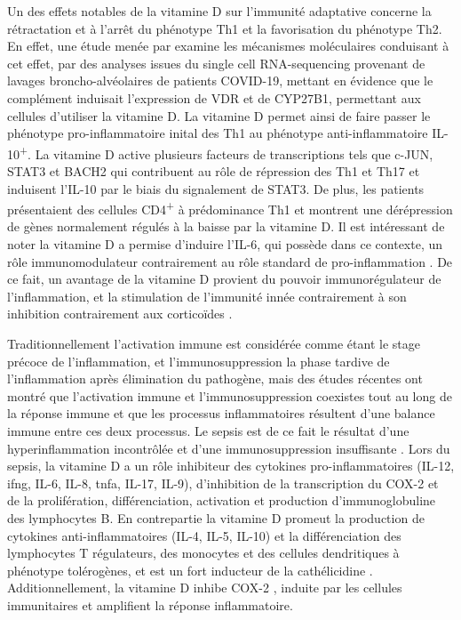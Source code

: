 \documentclass[
  a4paper,
  DIV=11,
  numbers=noendperiod,
  listof=totoc]{scrreprt}
\begin{document}
Un des effets notables de la vitamine D sur l'immunité adaptative
concerne la rétractation et à l'arrêt du phénotype \ac{Th1} et la
favorisation du phénotype Th2. En effet, une étude menée par
\textcite{Chauss.2022} examine les mécanismes moléculaires conduisant à
cet effet, par des analyses issues du single cell RNA-sequencing
provenant de lavages broncho-alvéolaires de patients COVID-19, mettant
en évidence que le complément induisait l'expression de \ac{VDR} et de
\ac{CYP27B1}, permettant aux cellules d'utiliser la vitamine D. La
vitamine D permet ainsi de faire passer le phénotype pro-inflammatoire
inital des \ac{Th1} au phénotype anti-inflammatoire
IL-10\textsuperscript{+}. La vitamine D active plusieurs facteurs de
transcriptions tels que c-JUN, STAT3 et BACH2 qui contribuent au rôle de
répression des \ac{Th1} et \ac{Th17} et induisent l'IL-10 par le biais
du signalement de STAT3. De plus, les patients présentaient des cellules
CD4\textsuperscript{+} à prédominance \ac{Th1} et montrent une
dérépression de gènes normalement régulés à la baisse par la vitamine D.
Il est intéressant de noter la vitamine D a permise d'induire l'IL-6,
qui possède dans ce contexte, un rôle immunomodulateur contrairement au
rôle standard de pro-inflammation \autocite{Chauss.2022}. De ce fait, un
avantage de la vitamine D provient du pouvoir immunorégulateur de
l'inflammation, et la stimulation de l'immunité innée contrairement à
son inhibition contrairement aux corticoïdes \autocite{Bouillon.2021}.

Traditionnellement l'activation immune est considérée comme étant le
stage précoce de l'inflammation, et l'immunosuppression la phase tardive
de l'inflammation après élimination du pathogène, mais des études
récentes ont montré que l'activation immune et l'immunosuppression
coexistes tout au long de la réponse immune et que les processus
inflammatoires résultent d'une balance immune entre ces deux processus.
Le sepsis est de ce fait le résultat d'une hyperinflammation incontrôlée
et d'une immunosuppression insuffisante \autocite{Cutuli.2024}. Lors du
sepsis, la vitamine D a un rôle inhibiteur des cytokines
pro-inflammatoires (IL-12, \ac{ifng}, IL-6, IL-8, \ac{tnfa}, IL-17,
IL-9), d'inhibition de la transcription du COX-2 et de la prolifération,
différenciation, activation et production d'immunoglobuline des
lymphocytes B. En contrepartie la vitamine D promeut la production de
cytokines anti-inflammatoires (IL-4, IL-5, IL-10) et la différenciation
des lymphocytes T régulateurs, des monocytes et des cellules
dendritiques à phénotype tolérogènes, et est un fort inducteur de la
cathélicidine \autocite{Cutuli.2024}. Additionnellement, la vitamine D
inhibe \ac{COX-2} \autocite{Wang.2014}, induite par les cellules
immunitaires et amplifient la réponse inflammatoire.
\end{document}
